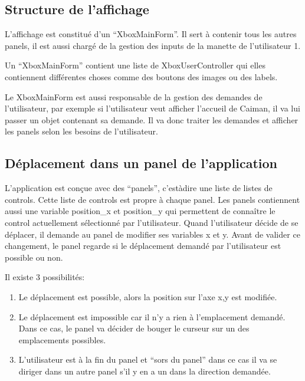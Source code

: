 \documentclass[a4paper,12pt,french]{sphinxmanual}
\begin{document}
\subsection{Structure de l’affichage}
\label{\detokenize{fonctionnelle:structure-de-laffichage}}
\sphinxAtStartPar
L’affichage est constitué d’un “XboxMainForm”. Il sert à contenir tous les autres panels, il est aussi chargé de la gestion des inputs de la manette de l’utilisateur 1.

\sphinxAtStartPar
Un “XboxMainForm” contient une liste de XboxUserController qui elles contiennent différentes choses comme des boutons des images ou des labels.

\sphinxAtStartPar
Le XboxMainForm est aussi responsable de la gestion des demandes de l’utilisateur, par exemple si l’utilisateur veut afficher l’accueil de Caiman, il va lui passer un objet contenant sa demande. Il va donc traiter les demandes et afficher les panels selon les besoins de l’utilisateur.


\subsection{Déplacement dans un panel de l’application}
\label{\detokenize{fonctionnelle:deplacement-dans-un-panel-de-lapplication}}
\sphinxAtStartPar
L’application est conçue avec des “panels”, c’est\sphinxhyphen{}à\sphinxhyphen{}dire une liste de listes de controls. Cette liste de controls est propre à chaque panel. Les panels contiennent aussi une variable position\_x et position\_y qui permettent de connaître le control actuellement sélectionné par l’utilisateur. Quand l’utilisateur décide de se déplacer, il demande au panel de modifier ses variables x et y. Avant de valider ce changement, le panel regarde si le déplacement demandé par l’utilisateur est possible ou non.

\sphinxAtStartPar
Il existe 3 possibilités:
\begin{enumerate}
%
\item {} 
\sphinxAtStartPar
Le déplacement est possible, alors la position sur l’axe x,y est modifiée.

\item {} 
\sphinxAtStartPar
Le déplacement est impossible car il n’y a rien à l’emplacement demandé. Dans ce cas, le panel va décider de bouger le curseur sur un des emplacements possibles.

\item {} 
\sphinxAtStartPar
L’utilisateur est à la fin du panel et “sors du panel” dans ce cas il va se diriger dans un autre panel s’il y en a un dans la direction demandée.

\end{enumerate}
\end{document}
